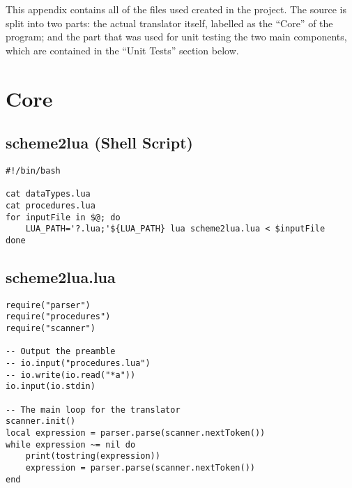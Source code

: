 This appendix contains all of the files used created in the project. The source
is split into two parts: the actual translator itself, labelled as the ``Core''
of the program; and the part that was used for unit testing the two main
components, which are contained in the ``Unit Tests'' section below.

\section{Core}
\subsection{scheme2lua (Shell Script)}

\scriptsize

\begin{verbatim}
#!/bin/bash

cat dataTypes.lua
cat procedures.lua
for inputFile in $@; do
    LUA_PATH='?.lua;'${LUA_PATH} lua scheme2lua.lua < $inputFile
done
\end{verbatim}

\subsection{scheme2lua.lua}
\begin{verbatim}
require("parser")
require("procedures")
require("scanner")

-- Output the preamble
-- io.input("procedures.lua")
-- io.write(io.read("*a"))
io.input(io.stdin)

-- The main loop for the translator
scanner.init()
local expression = parser.parse(scanner.nextToken())
while expression ~= nil do
    print(tostring(expression))
    expression = parser.parse(scanner.nextToken())
end
\end{verbatim}


